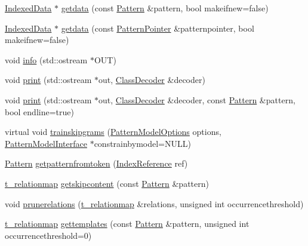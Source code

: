 \begin{DoxyCompactItemize}
\item 
\hyperlink{classIndexedData}{Indexed\+Data} $\ast$ \hyperlink{classIndexedPatternModel_a1ee41056c7235bf03573e6532cd5efce}{getdata} (const \hyperlink{classPattern}{Pattern} \&pattern, bool makeifnew=false)
\item 
\hyperlink{classIndexedData}{Indexed\+Data} $\ast$ \hyperlink{classIndexedPatternModel_a9311529a1123f602720b9e95f3f89236}{getdata} (const \hyperlink{classPatternPointer}{Pattern\+Pointer} \&patternpointer, bool makeifnew=false)
\item 
void \hyperlink{classIndexedPatternModel_a64fade10459a7699b856c8cb621789f9}{info} (std\+::ostream $\ast$O\+U\+T)
\item 
void \hyperlink{classIndexedPatternModel_a4a5f41aa99e3b93a9a816e9c21b9b790}{print} (std\+::ostream $\ast$out, \hyperlink{classClassDecoder}{Class\+Decoder} \&decoder)
\item 
void \hyperlink{classIndexedPatternModel_aed4218c952b051b523d8d5a31c5c00fb}{print} (std\+::ostream $\ast$out, \hyperlink{classClassDecoder}{Class\+Decoder} \&decoder, const \hyperlink{classPattern}{Pattern} \&pattern, bool endline=true)
\item 
virtual void \hyperlink{classIndexedPatternModel_acf0b5ec19f8b76b875dbef07ca0cb398}{trainskipgrams} (\hyperlink{classPatternModelOptions}{Pattern\+Model\+Options} options, \hyperlink{classPatternModelInterface}{Pattern\+Model\+Interface} $\ast$constrainbymodel=N\+U\+L\+L)
\item 
\hyperlink{classPattern}{Pattern} \hyperlink{classIndexedPatternModel_a205e5f3a0019a9948064084c0b92a7ce}{getpatternfromtoken} (\hyperlink{classIndexReference}{Index\+Reference} ref)
\item 
\hyperlink{patternmodel_8h_a8695a2b10be5a74c827cd6c11bd46fb9}{t\+\_\+relationmap} \hyperlink{classIndexedPatternModel_ac2478fc9fd1eabfc616c1692fc2a58d9}{getskipcontent} (const \hyperlink{classPattern}{Pattern} \&pattern)
\item 
void \hyperlink{classIndexedPatternModel_a0509989bf6bcb7d09dbc0e5c9e3dc84a}{prunerelations} (\hyperlink{patternmodel_8h_a8695a2b10be5a74c827cd6c11bd46fb9}{t\+\_\+relationmap} \&relations, unsigned int occurrencethreshold)
\item 
\hyperlink{patternmodel_8h_a8695a2b10be5a74c827cd6c11bd46fb9}{t\+\_\+relationmap} \hyperlink{classIndexedPatternModel_a951ae48d5f211af94a3c63102f708356}{gettemplates} (const \hyperlink{classPattern}{Pattern} \&pattern, unsigned int occurrencethreshold=0)
\item 

\end{DoxyCompactItemize}
